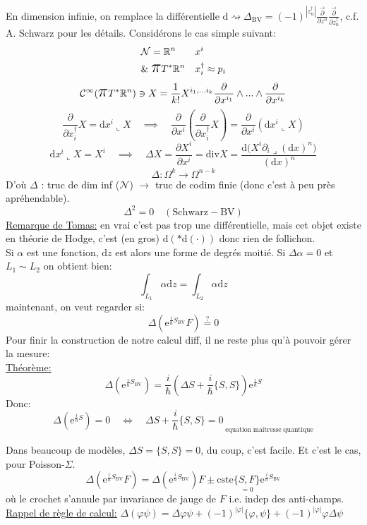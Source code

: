 \documentclass[a4paper,11pt]{article}
\renewcommand{\d}{{\mathrm{d}}}
\newcommand{\e}{{\mathrm{e}}}
\newcommand{\dr}[2]{\frac{\partial {#1}}{\partial{#2}}}
\newcommand{\ppi}{{\mathlarger{\mathlarger{\mathlarger{\pi}}}}}
\begin{document}
En dimension infinie, on remplace la différentielle $\d  \rightsquigarrow \Delta_\mathrm{BV} = (-1)^{|z^\dag_n|} \frac{\vec\partial}{\partial z^n}\frac{\vec\partial}{\partial z^\dag_n}$, c.f. A. Schwarz pour les détails. Considérons le cas simple suivant:
\begin{align*}
&\mathcal{N} = \mathbb{R}^n && x^i\\
&\& \; \ppi T^*\mathbb{R}^n && x_i^\dag \approx p_i
\end{align*}
$$\mathcal{C}^\infty(\ppi T^*\mathbb{R}^n) \ni X = \frac 1{k!} X^{i_1, ... i_k} \dr{}{x^{i_1}}\wedge ...\wedge \dr{}{x^{i_k}}$$
$$\dr{}{x^\dag_i} X = \d x^i \llcorner X \quad \implies\quad \dr{}{x^i} \left(\dr{}{x^\dag_i} X\right) = \dr{}{x^i}\left(\d x^i \llcorner X\right)$$
$$\d x^i \llcorner X = X^i \quad \implies \quad \Delta X = \dr{X^i}{x^i} = \mathrm{div} X = \frac{\d \Big( X^i \partial_i \lrcorner (\d x)^n\Big)}{(\d x)^n}$$
$$\Delta : \Omega^k \longrightarrow \Omega^{n-k}$$
D'où $\Delta$ : truc de dim inf ($\mathcal{N}$) $\longrightarrow$ truc de codim finie (donc c'est à peu près apréhendable).
$$\Delta^2 = 0 \quad (\mathrm{Schwarz} - \mathrm{BV})$$
\underline{Remarque de Tomas:} en vrai c'est pas trop une différentielle, mais cet objet existe en théorie de Hodge, c'est (en gros) $\d(*\d(\cdot))$ donc rien de follichon.\\

Si $\alpha$ est une fonction, $\d z$ est alors une forme de degrés moitié. Si $\Delta \alpha = 0$ et $L_1\sim L_2$ on obtient bien:
$$\int_{L_1} \alpha \d z = \int_{L_2} \alpha \d z$$ maintenant, on veut regarder si:
$$\Delta(\e^{\frac i\hbar S_\mathrm{BV}}F) \overset?= 0$$
Pour finir la construction de notre calcul diff, il ne reste plus qu'à pouvoir gérer la mesure:\\

\noindent\underline{Théorème:}
$$\Delta(\e^{\frac i\hbar S_\mathrm{BV}}) = \frac{i}{\hbar} \left(\Delta S + \frac{i}{\hbar} \{S,S\}\right) \e^{\frac i\hbar S}$$
Donc:
$$\Delta(\e^{\frac i\hbar S})=0 \quad \iff \quad \boxed{\Delta S + \frac{i}{\hbar} \{S,S\} = 0}_{\;\mathrm{equation}\;\mathrm{maitresse}\;\mathrm{quantique}}$$

Dans beaucoup de modèles, $\Delta S = \{S,S\} = 0$, du coup, c'est facile. Et c'est le cas, pour Poisson-$\Sigma$.
$$\Delta(\e^{\frac i\hbar S_\mathrm{BV}}F) = \Delta(\e^{\frac i\hbar S_\mathrm{BV}})F \pm \mathrm{cste}\underset{=0}{\{S,F\}} \e^{\frac i\hbar S_\mathrm{BV}}$$
où le crochet s'annule par invariance de jauge de $F$ i.e. indep des anti-champs.\\
\underline{Rappel de règle de calcul:} $\Delta(\varphi\psi) = \Delta\varphi \psi + (-1)^{|\varphi|}\{\varphi,\psi\} + (-1)^{|\varphi|} \varphi\Delta\psi$\\
\end{document}
